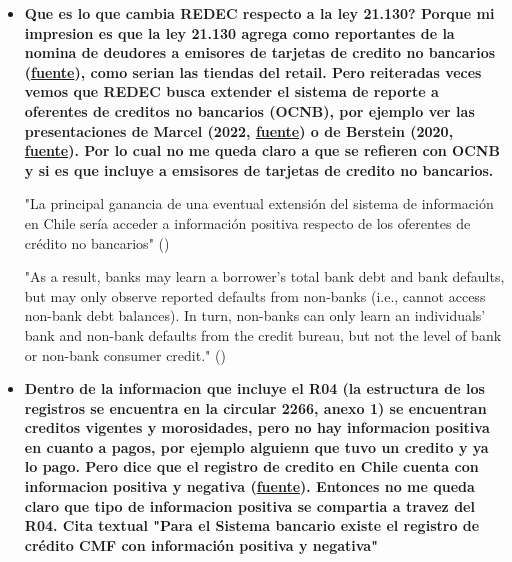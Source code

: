 \documentclass[12pt]{article}
\theoremstyle{plain}
\theoremstyle{plain}
\theoremstyle{definition}  %
\theoremstyle{remark}  %
\begin{document}
\begin{itemize}
    \item \textbf{Que es lo que cambia REDEC respecto a la ley 21.130?  Porque mi impresion es que la ley 21.130 agrega como reportantes de la nomina de deudores a emisores de tarjetas de credito no bancarios (\href{https://www.cmfchile.cl/sitio/aplic/serdoc/ver_sgd.php?s567=aef303581a81b5d6b8c7f134b13d05b7VFdwQmVVMVVRVFZOUkUweVRWUm5lVTEzUFQwPQ%3D%3D&secuencia=-1&t=1641949996}{fuente}), como serian las tiendas del retail. 
    Pero reiteradas veces vemos que REDEC busca extender el sistema de reporte a oferentes de creditos no bancarios (OCNB), por ejemplo ver las presentaciones de Marcel (2022, \href{a. https://www.
    camara.cl/verDoc.aspx?prmID=253759&prmTipo=DOCUMENTO COMISION}{fuente}) o de Berstein (2020, \href{https://www.bcentral.cl/documents/33528/133217/sbj27112020.pdf/1b00823d-93f4-193c-14ee-133b703af529?t=1693928559800}{fuente}). Por lo cual no me queda claro a que se refieren con OCNB y si es que incluye a emsisores de tarjetas de credito no bancarios. }


    "La principal ganancia de una eventual extensión del sistema de información en Chile sería acceder a información positiva respecto de los oferentes de crédito no  bancarios" (\cite{berstein_desarrollo_2020})



    "As a result,  banks may learn a borrower’s total bank debt and bank defaults, but may only observe  reported defaults from non-banks (i.e., cannot access non-bank debt balances). In turn,  non-banks can only learn an individuals’ bank and non-bank defaults from the credit  bureau, but not the level of bank or non-bank consumer credit." (\cite{liberman_equilibrium_2018})


    \item \textbf{Dentro de la informacion que incluye el R04 (la estructura de los registros se encuentra en la circular 2266, anexo 1) se encuentran creditos vigentes y morosidades, pero no hay informacion positiva en cuanto a pagos, por ejemplo alguienn que tuvo un credito y ya lo pago. Pero \textcite{berstein_desarrollo_2020} dice que el registro de credito en Chile cuenta con informacion positiva y negativa (\href{ttps : / / www . bcentral . cl / documents / 33528 / 133217 / sbj27112020 . pdf /
    1b00823d-93f4-193c-14ee-133b703af529?t=1693928559800}{fuente}). Entonces no me queda claro que tipo de informacion positiva se compartia a travez del R04. Cita textual "Para el Sistema bancario existe el registro de crédito CMF con información positiva y negativa"  }


\end{itemize}
\end{document}
